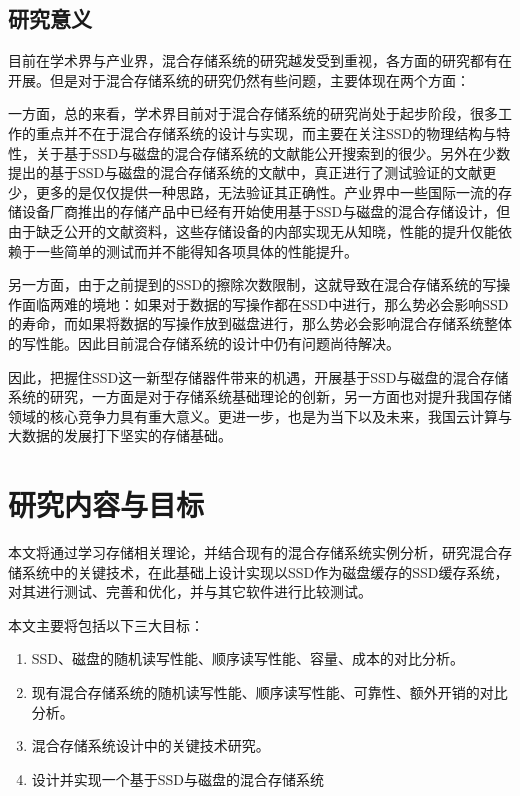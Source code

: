 \subsection{研究意义}

目前在学术界与产业界，混合存储系统的研究越发受到重视，各方面的研究都有在开展。但是对于混合存储系统的研究仍然有些问题，主要体现在两个方面：

一方面，总的来看，学术界目前对于混合存储系统的研究尚处于起步阶段，很多工作的重点并不在于混合存储系统的设计与实现，而主要在关注SSD的物理结构与特性，关于基于SSD与磁盘的混合存储系统的文献能公开搜索到的很少。另外在少数提出的基于SSD与磁盘的混合存储系统的文献中，真正进行了测试验证的文献更少，更多的是仅仅提供一种思路，无法验证其正确性。产业界中一些国际一流的存储设备厂商推出的存储产品中已经有开始使用基于SSD与磁盘的混合存储设计，但由于缺乏公开的文献资料，这些存储设备的内部实现无从知晓，性能的提升仅能依赖于一些简单的测试而并不能得知各项具体的性能提升。

另一方面，由于之前提到的SSD的擦除次数限制，这就导致在混合存储系统的写操作面临两难的境地：如果对于数据的写操作都在SSD中进行，那么势必会影响SSD的寿命，而如果将数据的写操作放到磁盘进行，那么势必会影响混合存储系统整体的写性能。因此目前混合存储系统的设计中仍有问题尚待解决。

因此，把握住SSD这一新型存储器件带来的机遇，开展基于SSD与磁盘的混合存储系统的研究，一方面是对于存储系统基础理论的创新，另一方面也对提升我国存储领域的核心竞争力具有重大意义。更进一步，也是为当下以及未来，我国云计算与大数据的发展打下坚实的存储基础。

\section{研究内容与目标}

本文将通过学习存储相关理论，并结合现有的混合存储系统实例分析，研究混合存储系统中的关键技术，在此基础上设计实现以SSD作为磁盘缓存的SSD缓存系统，对其进行测试、完善和优化，并与其它软件进行比较测试。

本文主要将包括以下三大目标：
\begin{enumerate}
    \item SSD、磁盘的随机读写性能、顺序读写性能、容量、成本的对比分析。
    \item 现有混合存储系统的随机读写性能、顺序读写性能、可靠性、额外开销的对比分析。
    \item 混合存储系统设计中的关键技术研究。
    \item 设计并实现一个基于SSD与磁盘的混合存储系统
\end{enumerate}

